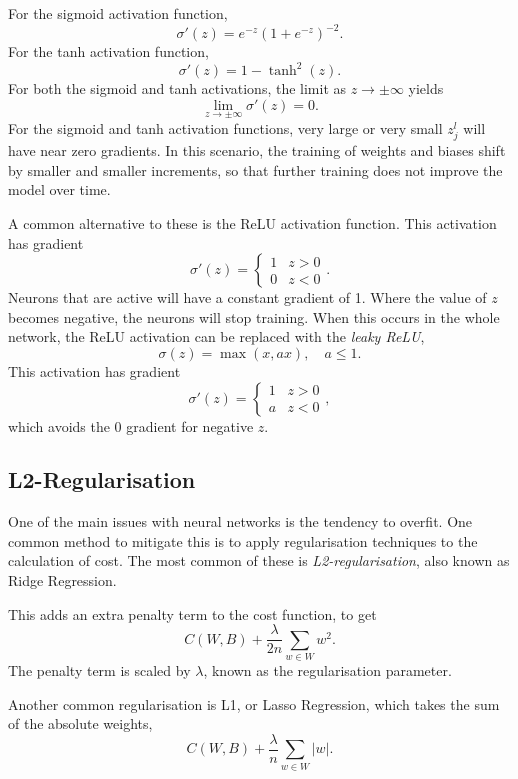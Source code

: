 \noindent For the sigmoid activation function,
\[
	\sigma '(z) = e^{-z}(1+e^{-z})^{-2}.
\]
For the tanh activation function,
\[
	\sigma '(z) = 1-\tanh^2(z).
\]
For both the sigmoid and tanh activations, the limit as $z\rightarrow\pm\infty$ yields 
\[
	\lim_{z\rightarrow\pm\infty}\sigma '(z)= 0.
\]
For the sigmoid and tanh activation functions, very large or very small $z_j^l$ will have near zero gradients. In this scenario, the training of weights and biases shift by smaller and smaller increments, so that further training does not improve the model over time.

A common alternative to these is the ReLU activation function. This activation has gradient
\[
	\sigma '(z) = \begin{cases}
		1 & z > 0 \\
		0 & z < 0
	\end{cases}.
\]
Neurons that are active will have a constant gradient of 1. Where the value of $z$ becomes negative, the neurons will stop training. When this occurs in the whole network, the ReLU activation can be replaced with the \textit{leaky ReLU},
\[
	\sigma(z) = \max(x, ax), \quad a \le 1.
\]
This activation has gradient
\[
	\sigma '(z) = \begin{cases}
		1 & z > 0 \\
		a & z < 0
	\end{cases},
\]
which avoids the 0 gradient for negative $z$.

\subsection{L2-Regularisation}\label{nnet-l2reg}


One of the main issues with neural networks is the tendency to overfit. One common method to mitigate this is to apply regularisation techniques to the calculation of cost. The most common of these is \textit{L2-regularisation}, also known as Ridge Regression.

This adds an extra penalty term to the cost function, to get
\[
	C(W,B) + \dfrac{\lambda}{2n}\sum_{w\in W}w^2.
\]
The penalty term is scaled by $\lambda$, known as the regularisation parameter. 

Another common regularisation is L1, or Lasso Regression, which takes the sum of the absolute weights,
\[
	C(W,B) + \dfrac{\lambda}{n}\sum_{w\in W}|w|.
\]

